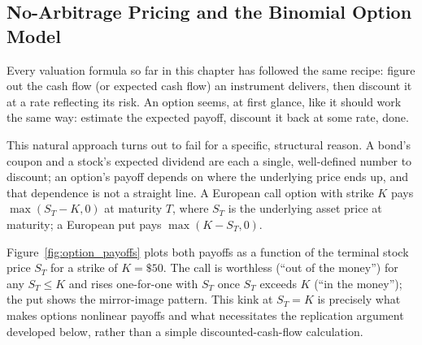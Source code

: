 \documentclass[../ai_in_finance]{subfiles}
\begin{document}
\subsection{No-Arbitrage Pricing and the Binomial Option Model}

Every valuation formula so far in this chapter has followed the same recipe: figure out the cash flow (or expected cash flow) an instrument delivers, then discount it at a rate reflecting its risk. An option seems, at first glance, like it should work the same way: estimate the expected payoff, discount it back at some rate, done.

This natural approach turns out to fail for a specific, structural reason. A bond's coupon and a stock's expected dividend are each a single, well-defined number to discount; an option's payoff depends on where the underlying price ends up, and that dependence is not a straight line. A European call option with strike $K$ pays $\max(S_T - K, 0)$ at maturity $T$, where $S_T$ is the underlying asset price at maturity; a European put pays $\max(K - S_T, 0)$.

Figure~\ref{fig:option_payoffs} plots both payoffs as a function of the terminal stock price $S_T$ for a strike of $K=\$50$. The call is worthless (``out of the money'') for any $S_T \le K$ and rises one-for-one with $S_T$ once $S_T$ exceeds $K$ (``in the money''); the put shows the mirror-image pattern. This kink at $S_T=K$ is precisely what makes options nonlinear payoffs and what necessitates the replication argument developed below, rather than a simple discounted-cash-flow calculation.

\begin{figure}[htbp]
\centering
\begin{lrbox}{\bookmeasuredbox}
\end{lrbox}
\ifdim\wd\bookmeasuredbox<0.65\linewidth
\setlength{\bookcapwidth}{0.65\linewidth}
\else
\setlength{\bookcapwidth}{\wd\bookmeasuredbox}
\fi
{}
\end{figure}
\end{document}
